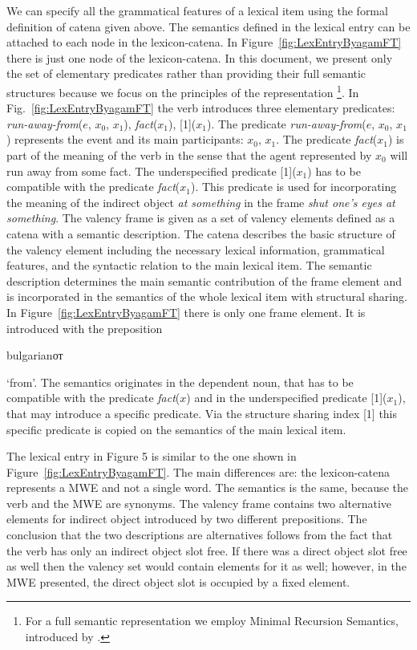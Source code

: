 \documentclass[output=paper]{langsci/langscibook}
\begin{document}
We can specify all the grammatical features of a lexical item using the
formal definition of catena given above. The semantics defined in the
lexical entry can be attached to each node in the lexicon-catena. In
Figure~\ref{fig:LexEntryByagamFT} there is just one node of the
lexicon-catena. In this document, we present only the set of elementary
predicates rather than providing their full semantic structures because we
focus on the principles of the representation \footnote{For  a full semantic
representation we employ Minimal Recursion Semantics, introduced by
\cite{copestake2005mrs}.}. In Fig.~\ref{fig:LexEntryByagamFT} the verb
introduces three elementary predicates: {\em run-away-from}($e$, $x_0$,
$x_1$), {\em fact}($x_1$), [1]($x_1$). The predicate {\em
run-away-from}($e$, $x_0$, $x_1$) represents the event and its main
participants: $x_0$, $x_1$. The predicate {\em fact}($x_1$) is part of the
meaning of the verb in the sense that the agent represented by $x_0$ will
run away from some fact. The underspecified predicate [1]($x_1$) has to be
compatible with the predicate {\em fact}($x_1$). This predicate is used for
incorporating the meaning of the indirect object \textit{at something} in the frame
\textit{shut one's eyes at something}. The valency frame is given as a set of
valency elements defined as a catena with a semantic description. The catena
describes the basic structure of the valency element including the necessary
lexical information, grammatical features, and the syntactic relation to the
main lexical item. The semantic description determines the main semantic
contribution of the frame element and is incorporated in the semantics of
the whole lexical item with structural sharing. In
Figure~\ref{fig:LexEntryByagamFT} there is only one frame element. It is
introduced with the preposition
\begin{otherlanguage*}{bulgarian}от\end{otherlanguage*} `from'. The
semantics originates in the dependent noun, that has to be compatible with
the predicate {\em fact}($x$) and in the underspecified predicate
[1]($x_1$), that may introduce a specific predicate. Via the structure
sharing index [1] this specific predicate is copied on the semantics of the
main lexical item.


The lexical entry in Figure 5 is similar to the one shown in
Figure~\ref{fig:LexEntryByagamFT}. The main differences are: the
lexicon-catena represents a MWE and not a single word. The semantics is the
same, because the verb and the MWE are synonyms. The valency frame contains
two alternative elements for indirect object introduced by two different
prepositions. The conclusion that the two descriptions are alternatives
follows from the fact that the verb has only an indirect object slot free. If
there was a direct object slot free as well then the valency set would
contain elements for it as well; however, in the MWE presented, the direct
object slot is occupied by a fixed element.
\end{document}
